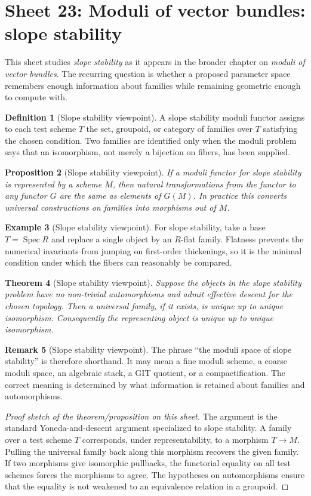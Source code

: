 \documentclass[11pt]{amsart}
\newtheorem{theorem}{Theorem}[section]
\newtheorem{proposition}[theorem]{Proposition}
\theoremstyle{definition}
\newtheorem{definition}[theorem]{Definition}
\newtheorem{example}[theorem]{Example}
\newtheorem{remark}[theorem]{Remark}
\newcommand{\Spec}{\operatorname{Spec}}
\begin{document}
\section{Sheet 23: Moduli of vector bundles: slope stability}
This sheet studies \emph{slope stability} as it appears in the broader chapter on \emph{moduli of vector bundles}.  The recurring question is whether a proposed parameter space remembers enough information about families while remaining geometric enough to compute with.
\begin{definition}[Slope stability viewpoint]
A slope stability moduli functor assigns to each test scheme $T$ the set, groupoid, or category of families over $T$ satisfying the chosen condition.  Two families are identified only when the moduli problem says that an isomorphism, not merely a bijection on fibers, has been supplied.
\end{definition}
\begin{proposition}[Slope stability viewpoint]
If a moduli functor for slope stability is represented by a scheme $M$, then natural transformations from the functor to any functor $G$ are the same as elements of $G(M)$.  In practice this converts universal constructions on families into morphisms out of $M$.
\end{proposition}
\begin{example}[Slope stability viewpoint]
For slope stability, take a base $T=\Spec R$ and replace a single object by an $R$-flat family.  Flatness prevents the numerical invariants from jumping on first-order thickenings, so it is the minimal condition under which the fibers can reasonably be compared.
\end{example}
\begin{theorem}[Slope stability viewpoint]
Suppose the objects in the slope stability problem have no non-trivial automorphisms and admit effective descent for the chosen topology.  Then a universal family, if it exists, is unique up to unique isomorphism.  Consequently the representing object is unique up to unique isomorphism.
\end{theorem}
\begin{remark}[Slope stability viewpoint]
The phrase ``the moduli space of slope stability'' is therefore shorthand.  It may mean a fine moduli scheme, a coarse moduli space, an algebraic stack, a GIT quotient, or a compactification.  The correct meaning is determined by what information is retained about families and automorphisms.
\end{remark}
\begin{proof}[Proof sketch of the theorem/proposition on this sheet]
The argument is the standard Yoneda-and-descent argument specialized to slope stability.  A family over a test scheme $T$ corresponds, under representability, to a morphism $T\to M$.  Pulling the universal family back along this morphism recovers the given family.  If two morphisms give isomorphic pullbacks, the functorial equality on all test schemes forces the morphisms to agree.  The hypotheses on automorphisms ensure that the equality is not weakened to an equivalence relation in a groupoid.
\end{proof}
\end{document}
